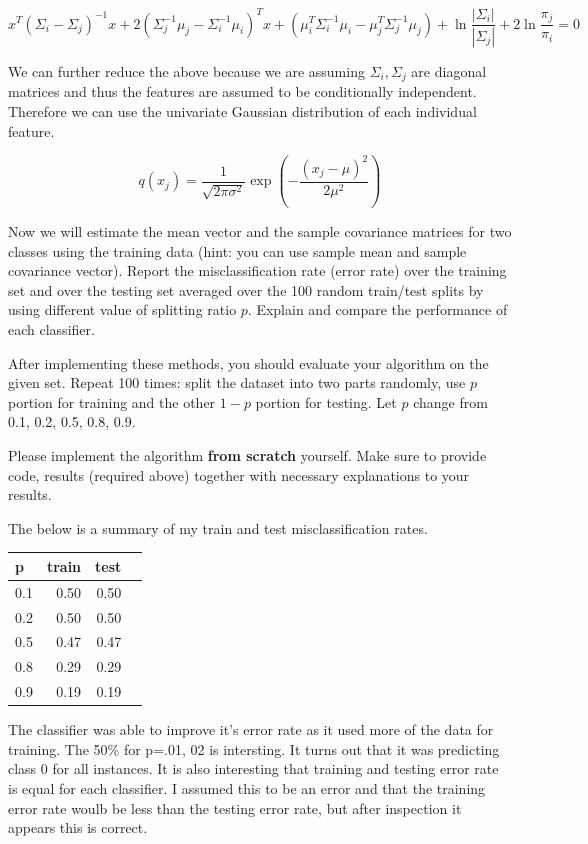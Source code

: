 \documentclass[a4paper,12pt,fleqn]{article}
\begin{document}
\begin{enumerate}
$$
x^T(\Sigma_i-\Sigma_j)^{-1}x+2(\Sigma_j^{-1}\mu_j-\Sigma^{-1}_i\mu_i)^Tx+(\mu_i^T\Sigma_i^{-1}\mu_i-\mu_j^T\Sigma_j^{-1}\mu_j) + \ln\frac{|\Sigma_i|}{|\Sigma_j|} + 2\ln\frac{\pi_j}{\pi_i} = 0
$$
\vspace{.15in}


We can further reduce the above because we are assuming $\Sigma_i, \Sigma_j$ are diagonal matrices and thus the features are assumed to be conditionally independent.  Therefore we can use the univariate Gaussian distribution of each individual feature.

$$
q(x_j) = \frac{1}{\sqrt{2\pi\sigma^2}}\exp(-\frac{(x_j-\mu)^2}{2\mu^2})
$$


Now we will estimate the mean vector and the sample covariance matrices for two classes using the training data (hint: you can use sample mean and sample covariance vector). Report the misclassification rate (error rate) over the training set and over the testing set averaged over the 100 random train/test splits by using different value of splitting ratio $p$. Explain and compare the performance of each classifier.

After implementing these methods, you should evaluate your algorithm on the given set. Repeat 100 times: split the dataset into two parts randomly, use $p$ portion for training and the other $1 - p$ portion for testing. Let $p$ change from 0.1, 0.2, 0.5, 0.8, 0.9.

Please implement the algorithm {\bf from scratch} yourself. Make sure to provide code, results (required above) together with necessary explanations to your results. 

The below is a summary of my train and test misclassification rates.

\vspace{.15in}
\begin{tabular}{lrrr}
\toprule
p &  train &  test \\
\midrule
0.1 &   0.50 &  0.50 \\
0.2 &   0.50 &  0.50 \\
0.5 &   0.47 &  0.47 \\
0.8 &   0.29 &  0.29 \\
0.9 &   0.19 &  0.19 \\
\bottomrule
\end{tabular}
\vspace{.15in}

The classifier was able to improve it's error rate as it used more of the data for training.  The 50\% for p=.01, 02 is intersting.  It turns out that it was predicting class 0 for all instances.  It is also interesting that training and testing error rate is equal for each classifier.  I assumed this to be an error and that the training error rate woulb be less than the testing error rate, but after inspection it appears this is correct.


\end{enumerate}
\end{document}
